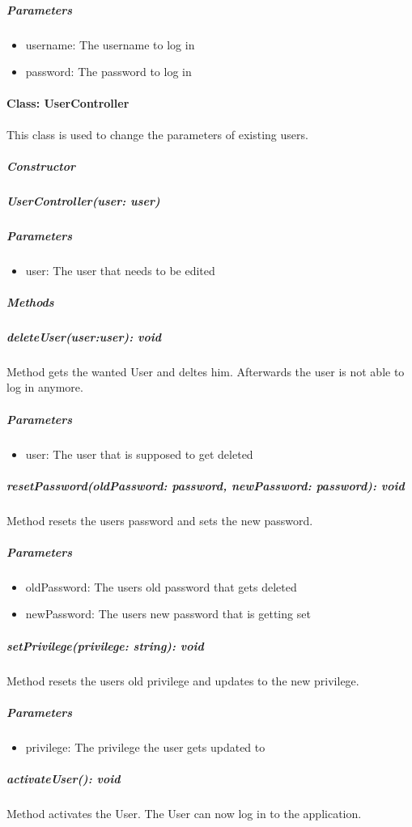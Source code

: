 \subparagraph{Parameters}
\begin{itemize}
	\item{username:}
	The username to log in
	\item{password:}
	The password to log in
\end{itemize}




\paragraph{Class: UserController}
This class is used to change the parameters of existing users.

\subparagraph{Constructor}

\subparagraph{UserController(user: user)}

\subparagraph{Parameters}

\begin{itemize}
	\item{user:}
	The user that needs to be edited
\end{itemize}

\subparagraph{Methods}

\subparagraph{deleteUser(user:user): void}

Method gets the wanted User and deltes him. Afterwards the user is not able to log in anymore.

\subparagraph{Parameters}
\begin{itemize}
	\item{user:}
	The user that is supposed to get deleted
\end{itemize}


\subparagraph{resetPassword(oldPassword: password, newPassword: password): void}

Method resets the users password and sets the new password.

\subparagraph{Parameters}
\begin{itemize}
	\item{oldPassword:}
	The users old password that gets deleted
	\item{newPassword:}
	The users new password that is getting set
\end{itemize}

\subparagraph{setPrivilege(privilege: string): void}

Method resets the users old privilege and updates to the new privilege.

\subparagraph{Parameters}
\begin{itemize}
	\item{privilege:}
	The privilege the user gets updated to
\end{itemize}

\subparagraph{activateUser(): void}

Method activates the User. The User can now log in to the application.










